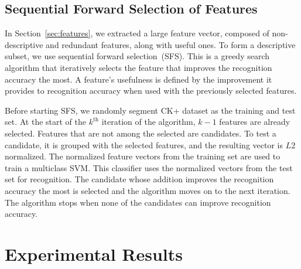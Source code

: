 \documentclass[hyperfootnotes=false]{article}
\begin{document}
\subsection{Sequential Forward Selection of Features}
\label{sec:sfs}

In Section~\ref{sec:features}, we extracted a large feature vector, composed of non-descriptive and redundant features, along with useful ones.
To form a descriptive subset, we use sequential forward selection~(SFS).
This is a greedy search algorithm that iteratively selects the feature that improves the recognition accuracy the most.
A feature's usefulness is defined by the improvement it provides to recognition accuracy when used with the previously selected features.

Before starting SFS, we randomly segment CK+ dataset as the training and test set.
At the start of the $k^\text{th}$ iteration of the algorithm, $k-1$ features are already selected.
Features that are not among the selected are candidates.
To test a candidate, it is grouped with the selected features, and the resulting vector is $L2$ normalized.
The normalized feature vectors from the training set are used to train a multiclass SVM.
This classifier uses the normalized vectors from the test set for recognition.
The candidate whose addition improves the recognition accuracy the most is selected and the algorithm moves on to the next iteration.
The algorithm stops when none of the candidates can improve recognition accuracy.

\section{Experimental Results}
\end{document}
